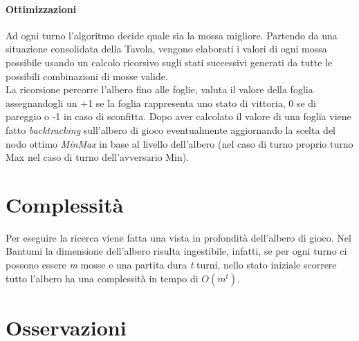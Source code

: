 \documentclass[paper=a4, fontsize=11pt]{scrartcl}	%
\numberwithin{equation}{section}															%
\numberwithin{figure}{section}																%
\numberwithin{table}{section}																%
\begin{document}
\paragraph{Ottimizzazioni}
Ad ogni turno l'algoritmo decide quale sia la mossa migliore. Partendo da una situazione consolidata della Tavola, vengono elaborati i valori di ogni mossa possibile usando un calcolo ricorsivo sugli stati successivi generati da tutte le possibili combinazioni di mosse valide.\\
La ricorsione percorre l'albero fino alle foglie, valuta il valore della foglia assegnandogli un +1 se la foglia rappresenta uno stato di vittoria, 0 se di pareggio o -1 in caso di sconfitta. 
Dopo aver calcolato il valore di una foglia viene fatto \textit{ backtracking} sull'albero di gioco eventualmente aggiornando la scelta del nodo ottimo \textit{ MinMax} in base al livello dell'albero (nel caso di turno proprio turno Max nel caso di turno dell'avversario Min).

\section{Complessit\`a}
Per eseguire la ricerca viene fatta una vista in profondit\`a dell'albero di gioco. Nel Bantumi la dimensione dell'albero risulta ingestibile, infatti, se per ogni turno ci possono essere \textit{ m} mosse e una partita dura \textit{ t} turni, nello stato iniziale scorrere tutto l'albero ha una complessit\`a in tempo di $O(m^t)$.




\section{Osservazioni}
\end{document}
